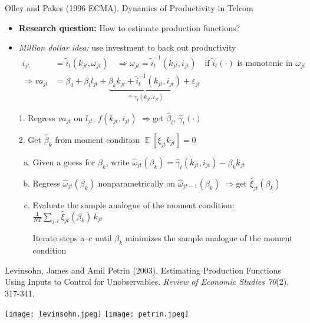 \documentclass[aspectratio=169,compress,t,xcolor=table]{beamer}
\DeclareMathOperator{\E}{\mathbb{E}}                       %
\begin{document}
\begin{frame}{}
Olley  and Pakes (1996 ECMA). Dynamics of Productivity in Telcom
  \begin{itemize}
    \item {\color{MyStructure}\textbf{Research question:}} How to estimate production functions?
    \vfill\item {\color{MyStructure}\textit{Million dollar idea:}} use investment to back out productivity
    \begin{align*}
      i_{jt} &= \tilde{i}_t(k_{jt}, \omega_{jt}) \quad \Rightarrow \omega_{jt} = \tilde{i}^{-1}_t(k_{jt}, i_{jt}) \quad \text{if \(\tilde{i}_t(\cdot)\) is monotonic in \(\omega_{jt}\)} \\
      \Rightarrow va_{jt} &= \beta_0 + \beta_l l_{jt} + \underbrace{\beta_k k_{jt} + \tilde{i}^{-1}_t(k_{jt}, i_{jt})}_{\doteq \gamma_t(k_{jt}, i_{jt})} + \varepsilon_{jt}
    \end{align*}
    \vfill\item[1.] Regress \(va_{jt}\) on \(l_{jt}\), \(f(k_{jt},i_{jt})\) \quad \(\Rightarrow \text{get } \hat{\beta}_l\), \(\hat{\gamma}_t(\cdot)\)
    \vfill\item[2.] Get \(\hat{\beta}_k\) from moment condition \(\E [\xi_{jt} k_{jt}] = 0\)
    \begin{enumerate}[a.]
      \item Given a guess for \(\beta_k\), write \(\hat{\omega}_{jt} (\beta_k) = \hat{\gamma}_t (k_{jt}, i_{jt}) - \beta_k k_{jt}\)
      \item Regress \(\hat{\omega}_{jt} (\beta_k)\) nonparametrically on \(\hat{\omega}_{jt-1} (\beta_k)\) \quad \(\Rightarrow \text{get } \hat{\xi}_{jt} (\beta_k)\)
      \item Evaluate the sample analogue of the moment condition: \(\frac{1}{NT} \sum_{j, t} \hat{\xi}_{jt} (\beta_k) \, k_{jt}\) \\[0.5em]
      \item[] Iterate steps a--c until \(\beta_k\) minimizes the sample analogue of the moment condition
    \end{enumerate}
  \end{itemize}
\end{frame}

\begin{frame}{}
  Levinsohn, James and Amil Petrin (2003). Estimating Production Functions Using Inputs to Control for Unobservables. \textit{Review of Economic Studies 70}(2), 317-341.
  \begin{center}
    \texttt{[image: levinsohn.jpeg]} \hspace*{1em}
    \texttt{[image: petrin.jpeg]}
  \end{center}
\end{frame}
\addtocounter{framenumber}{-1}
\end{document}
